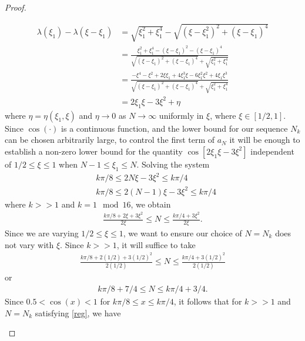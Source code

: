 \documentclass[12pt,reqno]{amsart}
\numberwithin{equation}{section}  %
\begin{document}
\begin{proof}
\begin{framed}
%
\begin{equation}
  \label{ty}
\begin{split}
  \lambda(\xi_{1}) - \lambda(\xi - \xi_{1})  
  & = \sqrt{\xi_{1}^{2} + \xi_{1}^{4}} -
  \sqrt{(\xi - \xi_{1}^{2})^{2} + (\xi - \xi_1)^{4}}  
  \\
  & = 
  \frac{\xi_{1}^{2} + \xi_{1}^{4} - (\xi - \xi_{1})^{2} - (\xi - \xi_{1})^{4}}{\sqrt{(\xi - \xi_{1})^{2} + (\xi - \xi_{1})^{4}} + \sqrt{\xi_{1}^{2} + \xi_{1}^{4}}}
  \\
  & = \frac{-\xi^{4} - \xi^{2} + 2 \xi \xi_{1} + 4 \xi_{1}^{3} \xi - 6 \xi_{1}^{2}\xi^{2} + 4 \xi_{1} \xi^{3}}{\sqrt{(\xi - \xi_{1})^{2} + (\xi - \xi_{1})^{4}} + \sqrt{\xi_{1}^{2} + \xi_{1}^{4}}}
\\
  & = 2 \xi_{1} \xi - 3 \xi^{2} + \eta
\end{split}
\end{equation}
%
where $\eta = \eta(\xi_{1}, \xi)$ and $\eta \to 0$ as $N \to \infty$ uniformly in $\xi$, where $\xi \in [1/2, 1]$. 
%
%
Since $\cos(\cdot)$ is a continuous function, and the lower bound for our sequence $N_{k}$ can be chosen arbitrarily large, to control the first term of $a_{N}$ it will be enough to establish a non-zero lower bound for the quantity $\cos[2 \xi_{1} \xi - 3 \xi^{2}]$ independent of $1/2 \le \xi \le 1$
when $N-1 \le \xi_{1} \le N$. Solving the system
%
%
\begin{equation*}
\begin{split}
  &k\pi/8 \le 2N\xi - 3\xi^{2} \le k\pi/4
\\
& k\pi/8 \le 2(N-1)\xi - 3\xi^{2} \le k\pi/4
\end{split}
\end{equation*}
%
where $k >>1$ and $k = 1\mod{16}$, we obtain
%
%
%
\begin{equation*}
\begin{split}
  \frac{k\pi /8 + 2 \xi + 3 \xi^{2}}{2 \xi} \le N \le \frac{k \pi /4 + 3 \xi^{2}}{2 \xi}.
\end{split}
\end{equation*}
%
Since we are varying $1/2 \le \xi \le 1$, we want to ensure our choice of $N = N_{k}$ does not vary with $\xi$. Since $k >>1$, it will suffice to take 
%
%
\begin{equation*}
\begin{split}
\frac{k\pi /8 + 2 (1/2) + 3 (1/2)^{2}}{2 (1/2)} \le N \le \frac{k \pi /4 + 3 (1/2)^{2}}{2 (1/2)}
\end{split}
\end{equation*}
%
%
or
%
%
\begin{equation}
  \label{reg}
\begin{split}
k\pi/8 + 7/4 \le N \le k \pi/4 + 3/4.
\end{split}
\end{equation}
%
%
%
Since $0.5 < \cos(x) < 1$ for $k\pi/8  \le x \le k\pi/4$, it follows that for $k >>1$ and $N = N_{k}$ satisfying \eqref{reg}, we have 


\end{framed}
\end{proof}
\end{document}
